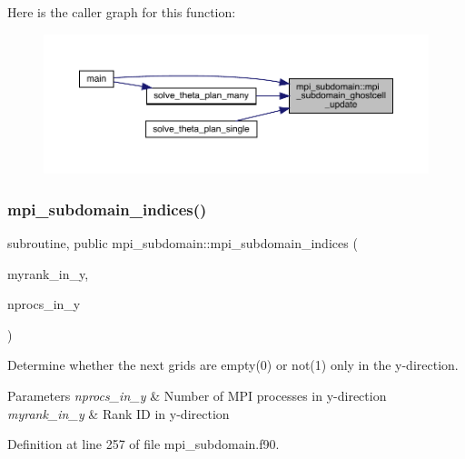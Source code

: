 Here is the caller graph for this function\+:
\nopagebreak
\begin{figure}[H]
\begin{center}
\leavevmode
\includegraphics[width=350pt]{namespacempi__subdomain_a2e34a77537009dd448375e8fdc8d5b62_icgraph}
\end{center}
\end{figure}
\mbox{\label{namespacempi__subdomain_afe948dc18da021f2448cf9a6265155fe}} 
\subsubsection{\texorpdfstring{mpi\_subdomain\_indices()}{mpi\_subdomain\_indices()}}
{\footnotesize\ttfamily subroutine, public mpi\+\_\+subdomain\+::mpi\+\_\+subdomain\+\_\+indices (\begin{DoxyParamCaption}\item[{integer, intent(in)}]{myrank\+\_\+in\+\_\+y,  }\item[{integer, intent(in)}]{nprocs\+\_\+in\+\_\+y }\end{DoxyParamCaption})}



Determine whether the next grids are empty(0) or not(1) only in the y-\/direction. 


\begin{DoxyParams}{Parameters}
{\em nprocs\+\_\+in\+\_\+y} & Number of M\+PI processes in y-\/direction \\
\hline
{\em myrank\+\_\+in\+\_\+y} & Rank ID in y-\/direction \\
\hline
\end{DoxyParams}


Definition at line 257 of file mpi\+\_\+subdomain.\+f90.

